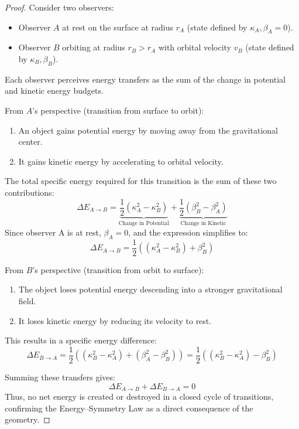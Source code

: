 \documentclass[12pt, a4paper]{article}
\begin{document}
\begin{proof}
Consider two observers:
\begin{itemize}
\item Observer $A$ at rest on the surface at radius $r_A$ (state defined by $\kappa_A, \beta_A=0$).
\item Observer $B$ orbiting at radius $r_B > r_A$ with orbital velocity $v_B$ (state defined by $\kappa_B, \beta_B$).
\end{itemize}
Each observer perceives energy transfers as the sum of the change in potential and kinetic energy budgets.

From $A$'s perspective (transition from surface to orbit):
\begin{enumerate}
\item An object gains potential energy by moving away from the gravitational center.
\item It gains kinetic energy by accelerating to orbital velocity.
\end{enumerate}
The total specific energy required for this transition is the sum of these two contributions:
\begin{equation}
\boxed{\Delta E_{A \to B} = \underbrace{\frac{1}{2}\left(\kappa_A^2 - \kappa_B^2\right)}_{\text{Change in Potential}} + \underbrace{\frac{1}{2}\left(\beta_B^2 - \beta_A^2\right)}_{\text{Change in Kinetic}}}
\end{equation}
Since observer A is at rest, $\beta_A = 0$, and the expression simplifies to:
\begin{equation}
\Delta E_{A \to B} = \frac{1}{2}\left((\kappa_A^2 - \kappa_B^2) + \beta_B^2\right)
\end{equation}

From $B$'s perspective (transition from orbit to surface):
\begin{enumerate}
\item The object loses potential energy descending into a stronger gravitational field.
\item It loses kinetic energy by reducing its velocity to rest.
\end{enumerate}
This results in a specific energy difference:
\begin{equation}
\Delta E_{B \to A} = \frac{1}{2}\left((\kappa_B^2 - \kappa_A^2) + (\beta_A^2 - \beta_B^2)\right) = \frac{1}{2}\left((\kappa_B^2 - \kappa_A^2) - \beta_B^2\right)
\end{equation}

Summing these transfers gives:
\begin{equation}
\Delta E_{A \to B} + \Delta E_{B \to A} = 0
\end{equation}
Thus, no net energy is created or destroyed in a closed cycle of transitions, confirming the Energy–Symmetry Law as a direct consequence of the geometry.
\end{proof}
\end{document}
